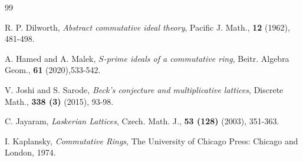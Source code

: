 \documentclass[10pt,twoside,a4]{amsart}
\numberwithin{equation}{section}
\theoremstyle{plain}
\theoremstyle{definition}
\begin{document}
\begin{thebibliography}{99}
		
		
		 R. P. Dilworth, {\it Abstract commutative ideal theory}, Pacific J. Math., {\bf 12} (1962), 481-498.
		
		
		 A. Hamed and A. Malek, {\it $S$-prime ideals of a commutative ring}, Beitr. Algebra Geom., {\bf 61} (2020),533-542.
		
		 V.  Joshi and S. Sarode, {\it Beck's conjecture and multiplicative
			lattices}, Discrete Math., {\bf 338 (3)} (2015), 93-98.
		
		
		
		
		
		
		
		 C. Jayaram, {\it Laskerian Lattices}, Czech. Math. J., {\bf 53 (128)} (2003), 351-363.
		
		
		
		 
		  I. Kaplansky,  \textit{Commutative Rings}, The University of Chicago Press: Chicago and London, 1974.
		 
		

\end{thebibliography}
\end{document}
